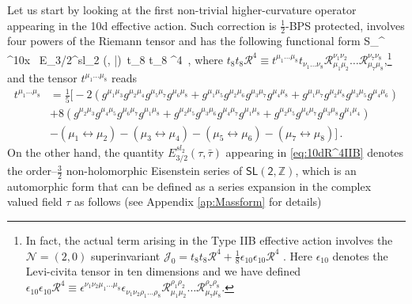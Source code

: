Let us start by looking at the first non-trivial higher-curvature operator appearing in the 10d effective action. Such correction is $\frac12$-BPS protected, involves four powers of the Riemann tensor and has the following functional form \cite{Green:1999pv,Green:1997di,Pioline:1998mn}
%
\beq
S_^{}\, \supset\,  \int \dd^{10}x \, E_{3/2}^{sl_2} (\tau, \bar \tau)\, t_8 t_8 ^4\, ,
\label{eq:10dR^4IIB}
\eeq
%
where $t_8 t_8 \mathcal{R}^4 \equiv t^{\mu_1 \ldots \mu_8} t_{\nu_1 \ldots \nu_8} \mathcal{R}^{\nu_1 \nu_2}_{\mu_1 \mu_2} \ldots \mathcal{R}^{\nu_7 \nu_8}_{\mu_7 \mu_8}$,\footnote{In fact, the actual term arising in the Type IIB effective action involves the $\mathcal{N}=(2,0)$ superinvariant $\mathcal{J}_0 = t_8 t_8 \mathcal{R}^4+ \frac{1}{8} \epsilon_{10}\epsilon_{10} \mathcal{R}^4$ \cite{Kiritsis:1997em}. Here $\epsilon_{10}$ denotes the Levi-civita tensor in ten dimensions and we have defined $\epsilon_{10}\epsilon_{10} \mathcal{R}^4 \equiv \epsilon^{\nu_1 \nu_2 \mu_1 \ldots \mu_8} \epsilon_{\nu_1 \nu_2 \rho_1 \ldots \rho_8} \mathcal{R}^{\rho_1 \rho_2}_{\mu_1 \mu_2} \ldots \mathcal{R}^{\rho_7 \rho_8}_{\mu_7 \mu_8}$.} and the tensor $t^{\mu_1 \ldots \mu_8}$ reads \cite{Green:1981ya}
%
\begin{equation}\label{eq:t8tensor}
\begin{aligned}
    t^{\mu_1 \ldots \mu_8} &= \frac{1}{5} \Big[ -2 \left( g^{\mu_1 \mu_3} g^{\mu_2 \mu_4} g^{\mu_5 \mu_7} g^{\mu_6 \mu_8} + g^{\mu_1 \mu_5} g^{\mu_2 \mu_6} g^{\mu_3 \mu_7} g^{\mu_4 \mu_8} + g^{\mu_1 \mu_7} g^{\mu_2 \mu_8} g^{\mu_3 \mu_5} g^{\mu_4 \mu_6}\right)\\
    & + 8 \left( g^{\mu_2 \mu_3} g^{\mu_4 \mu_5} g^{\mu_6 \mu_7} g^{\mu_1 \mu_8} + g^{\mu_2 \mu_5} g^{\mu_3 \mu_6} g^{\mu_4 \mu_7} g^{\mu_1 \mu_8} + g^{\mu_2 \mu_5} g^{\mu_6 \mu_7} g^{\mu_3 \mu_8} g^{\mu_1 \mu_4}\right)\\
    & - \left(\mu_1 \leftrightarrow \mu_2 \right) - \left(\mu_3 \leftrightarrow \mu_4 \right) - \left(\mu_5 \leftrightarrow \mu_6 \right) - \left(\mu_7 \leftrightarrow \mu_8 \right) \Big]\, .
\end{aligned}
\end{equation}
%
On the other hand, the quantity $E_{3/2}^{sl_2} (\tau, \bar \tau)$ appearing in \eqref{eq:10dR^4IIB} denotes the order--$\frac32$ non-holomorphic Eisenstein series of $\mathsf{SL(2,\mathbb{Z})}$, which is an automorphic form that can be defined as a series expansion in the complex valued field $\tau$ as follows (see Appendix \ref{ap:Massform} for details)

